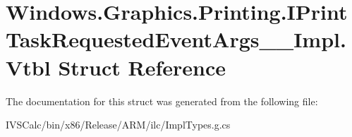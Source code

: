 \hypertarget{struct_windows_1_1_graphics_1_1_printing_1_1_i_print_task_requested_event_args_____impl_1_1_vtbl}{}\section{Windows.\+Graphics.\+Printing.\+I\+Print\+Task\+Requested\+Event\+Args\+\_\+\+\_\+\+Impl.\+Vtbl Struct Reference}
\label{struct_windows_1_1_graphics_1_1_printing_1_1_i_print_task_requested_event_args_____impl_1_1_vtbl}


The documentation for this struct was generated from the following file\+:\begin{DoxyCompactItemize}
\item 
I\+V\+S\+Calc/bin/x86/\+Release/\+A\+R\+M/ilc/Impl\+Types.\+g.\+cs\end{DoxyCompactItemize}

